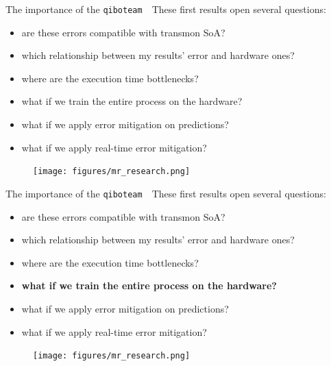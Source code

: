 \documentclass[8pt, xcolor={svgnames}, hyperref={colorlinks, linkcolor=black, citecolor=amethyst, urlcolor=amethyst}]{beamer}
\begin{document}
\begin{frame}{The importance of the \texttt{qiboteam}}
\faArrowCircleRight\,\, These first results open several questions:
\pause
\begin{itemize}[noitemsep]
    \item[\footnotesize\faSquare] are these errors compatible with transmon SoA?
    \pause
    \item[\footnotesize\faSquare] which relationship between my results' error and hardware ones?
    \pause
    \item[\footnotesize\faSquare] where are the execution time bottlenecks?
    \pause
    \item[\footnotesize\faSquare] what if we train the entire process on the hardware?
    \pause
    \item[\footnotesize\faSquare] what if we apply error mitigation on predictions?
    \pause
    \item[\footnotesize\faSquare] what if we apply real-time error mitigation?
    \pause
\end{itemize}
\begin{figure}
    \texttt{[image: figures/mr\_research.png]}
\end{figure}
\end{frame}

\begin{frame}{The importance of the \texttt{qiboteam}}
\faArrowCircleRight\,\, These first results open several questions:
\begin{itemize}[noitemsep]
    \item[\footnotesize\faSquare] are these errors compatible with transmon SoA?
    \item[\footnotesize\faSquare] which relationship between my results' error and hardware ones?
    \item[\footnotesize\faSquare] where are the execution time bottlenecks?
    \item[\footnotesize\faSquare] \textcolor{amethyst}{\textbf{what if we train 
    the entire process on the hardware?}}
    \item[\footnotesize\faSquare] what if we apply error mitigation on predictions?
    \item[\footnotesize\faSquare] what if we apply real-time error mitigation?
\end{itemize}
\begin{figure}
    \texttt{[image: figures/mr\_research.png]}
\end{figure}
\end{frame}
\end{document}
